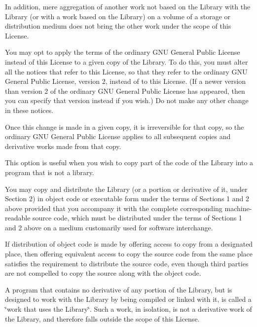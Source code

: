 In addition, mere aggregation of another work not based on the Library with the Library (or with a work based on the Library) on a volume of a storage or distribution medium does not bring the other work under the scope of this License.


\begin{DoxyEnumerate}
\item You may opt to apply the terms of the ordinary G\+NU General Public License instead of this License to a given copy of the Library. To do this, you must alter all the notices that refer to this License, so that they refer to the ordinary G\+NU General Public License, version 2, instead of to this License. (If a newer version than version 2 of the ordinary G\+NU General Public License has appeared, then you can specify that version instead if you wish.) Do not make any other change in these notices.
\end{DoxyEnumerate}

Once this change is made in a given copy, it is irreversible for that copy, so the ordinary G\+NU General Public License applies to all subsequent copies and derivative works made from that copy.

This option is useful when you wish to copy part of the code of the Library into a program that is not a library.


\begin{DoxyEnumerate}
\item You may copy and distribute the Library (or a portion or derivative of it, under Section 2) in object code or executable form under the terms of Sections 1 and 2 above provided that you accompany it with the complete corresponding machine-\/readable source code, which must be distributed under the terms of Sections 1 and 2 above on a medium customarily used for software interchange.
\end{DoxyEnumerate}

If distribution of object code is made by offering access to copy from a designated place, then offering equivalent access to copy the source code from the same place satisfies the requirement to distribute the source code, even though third parties are not compelled to copy the source along with the object code.


\begin{DoxyEnumerate}
\item A program that contains no derivative of any portion of the Library, but is designed to work with the Library by being compiled or linked with it, is called a \char`\"{}work that uses the Library\char`\"{}. Such a work, in isolation, is not a derivative work of the Library, and therefore falls outside the scope of this License.
\end{DoxyEnumerate}

